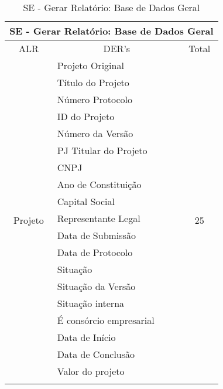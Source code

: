     \begin{table}[!h]
    \centering
    \caption{SE - Gerar Relatório: Base de Dados Geral}
    \label{se_base_geral}
    \begin{tabular}{|c|l|c|}
    \hline
    \multicolumn{3}{|c|}{SE - Gerar Relatório: Base de Dados Geral}                 \\ \hline
    ALR                         & \multicolumn{1}{c|}{DER's}    & Total                \\ \hline
    \multirow{25}{*}{Projeto}   & Projeto Original              & \multirow{21}{*}{25} \\ \cline{2-2}
				& Título do Projeto             &                      \\ \cline{2-2}
				& Número Protocolo              &                      \\ \cline{2-2}
				& ID do Projeto                 &                      \\ \cline{2-2}
				& Número da Versão              &                      \\ \cline{2-2}
				& PJ Titular do Projeto         &                      \\ \cline{2-2}
				& CNPJ                          &                      \\ \cline{2-2}
				& Ano de Constituição           &                      \\ \cline{2-2}
				& Capital Social                &                      \\ \cline{2-2}
				& Representante Legal           &                      \\ \cline{2-2}
				& Data de Submissão             &                      \\ \cline{2-2}
				& Data de Protocolo             &                      \\ \cline{2-2}
				& Situação                      &                      \\ \cline{2-2}
				& Situação da Versão            &                      \\ \cline{2-2}
				& Situação interna              &                      \\ \cline{2-2}
				& É consórcio empresarial       &                      \\ \cline{2-2}
				& Data de Início                &                      \\ \cline{2-2}
				& Data de Conclusão             &                      \\ \cline{2-2}
				& Valor do projeto              &                      \\ \cline{2-2}

\end{tabular}
\end{table}
